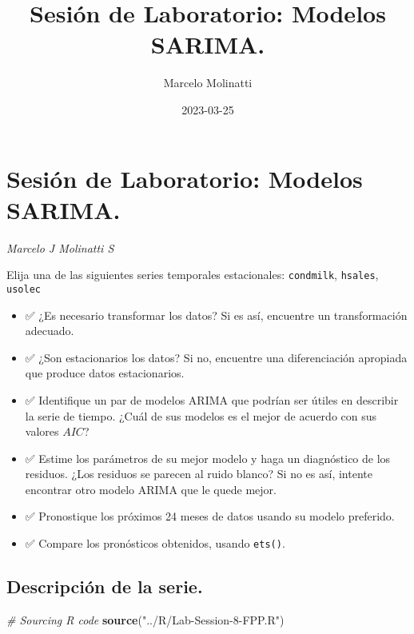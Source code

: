 \documentclass[]{article}
\title{Sesión de Laboratorio: Modelos SARIMA.}
\author{Marcelo Molinatti}
\date{2023-03-25}
\newenvironment{Shaded}{\begin{snugshade}}{\end{snugshade}}
\newcommand{\CommentTok}[1]{\textcolor[rgb]{0.56,0.35,0.01}{\textit{#1}}}
\newcommand{\KeywordTok}[1]{\textcolor[rgb]{0.13,0.29,0.53}{\textbf{#1}}}
\newcommand{\NormalTok}[1]{#1}
\newcommand{\StringTok}[1]{\textcolor[rgb]{0.31,0.60,0.02}{#1}}
\providecommand{\tightlist}{%
  \setlength{\itemsep}{0pt}\setlength{\parskip}{0pt}}
\begin{document}
\maketitle

{
\setcounter{tocdepth}{2}
\tableofcontents
}
\hypertarget{sesiuxf3n-de-laboratorio-modelos-sarima.}{%
\section{Sesión de Laboratorio: Modelos SARIMA.}\label{sesiuxf3n-de-laboratorio-modelos-sarima.}}

\emph{Marcelo J Molinatti S}

Elija una de las siguientes series temporales estacionales: \texttt{condmilk}, \texttt{hsales}, \texttt{usolec}

\begin{itemize}
\tightlist
\item
  ✅ ¿Es necesario transformar los datos? Si es así, encuentre un transformación adecuado.
\item
  ✅ ¿Son estacionarios los datos? Si no, encuentre una diferenciación apropiada que produce datos estacionarios.
\item
  ✅ Identifique un par de modelos ARIMA que podrían ser útiles en describir la serie de tiempo. ¿Cuál de sus modelos es el mejor de acuerdo con sus valores \(AIC\)?
\item
  ✅ Estime los parámetros de su mejor modelo y haga un diagnóstico de los residuos. ¿Los residuos se parecen al ruido blanco? Si no es así, intente encontrar otro modelo ARIMA que le quede mejor.
\item
  ✅ Pronostique los próximos 24 meses de datos usando su modelo preferido.
\item
  ✅ Compare los pronósticos obtenidos, usando \texttt{ets()}.
\end{itemize}

\hypertarget{descripciuxf3n-de-la-serie.}{%
\subsection{Descripción de la serie.}\label{descripciuxf3n-de-la-serie.}}

\begin{Shaded}
\begin{Highlighting}[]
\CommentTok{# Sourcing R code}
\KeywordTok{source}\NormalTok{(}\StringTok{"../R/Lab-Session-8-FPP.R"}\NormalTok{)}
\end{Highlighting}
\end{Shaded}
\end{document}
